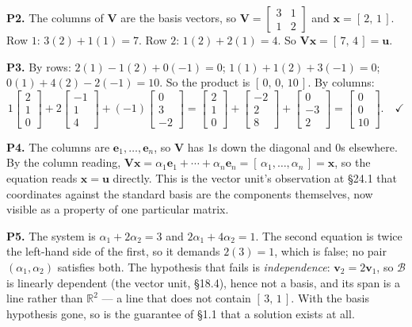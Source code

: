 \documentclass[11pt]{article}
\theoremstyle{plain}
\theoremstyle{definition}
\theoremstyle{remark}
\newcommand{\R}{\mathbb{R}}
\newcommand{\vc}[1]{\mathbf{#1}}        %
\newcommand{\mt}[1]{\mathbf{#1}}        %
\newcommand{\bas}{\mathcal{B}}
\begin{document}
\smallskip
\noindent\textbf{P2.} The columns of $\mt{V}$ are the basis vectors, so
$\mt{V}=\begin{bmatrix} 3 & 1 \\ 1 & 2\end{bmatrix}$ and
$\vc{x}=[\,2,\,1\,]$. Row $1$: $3(2)+1(1)=7$. Row $2$: $1(2)+2(1)=4$. So
$\mt{V}\vc{x}=[\,7,\,4\,]=\vc{u}$. \checkmark

\smallskip
\noindent\textbf{P3.} By rows: $2(1)-1(2)+0(-1)=0$; $1(1)+1(2)+3(-1)=0$;
$0(1)+4(2)-2(-1)=10$. So the product is $[\,0,\,0,\,10\,]$. By columns:
\[
  1\begin{bmatrix}2\\1\\0\end{bmatrix}
  + 2\begin{bmatrix}-1\\1\\4\end{bmatrix}
  + (-1)\begin{bmatrix}0\\3\\-2\end{bmatrix}
  = \begin{bmatrix}2\\1\\0\end{bmatrix}
  + \begin{bmatrix}-2\\2\\8\end{bmatrix}
  + \begin{bmatrix}0\\-3\\2\end{bmatrix}
  = \begin{bmatrix}0\\0\\10\end{bmatrix} . \quad\checkmark
\]

\smallskip
\noindent\textbf{P4.} The columns are $\vc{e}_1,\dots,\vc{e}_n$, so $\mt{V}$ has
$1$s down the diagonal and $0$s elsewhere. By the column reading,
$\mt{V}\vc{x}=\alpha_1\vc{e}_1+\cdots+\alpha_n\vc{e}_n=[\,\alpha_1,\dots,\alpha_n\,]=\vc{x}$,
so the equation reads $\vc{x}=\vc{u}$ directly. This is the vector unit's
observation at \S24.1 that coordinates against the standard basis are the
components themselves, now visible as a property of one particular matrix.

\smallskip
\noindent\textbf{P5.} The system is $\alpha_1+2\alpha_2=3$ and
$2\alpha_1+4\alpha_2=1$. The second equation is twice the left-hand side of the
first, so it demands $2(3)=1$, which is false; no pair
$(\alpha_1,\alpha_2)$ satisfies both. The hypothesis that fails is
\emph{independence}: $\vc{v}_2=2\vc{v}_1$, so $\bas$ is linearly dependent (the
vector unit, \S18.4), hence not a basis, and its span is a line rather than
$\R^{2}$ --- a line that does not contain $[\,3,\,1\,]$. With the basis
hypothesis gone, so is the guarantee of \S1.1 that a solution exists at all.
\end{document}
